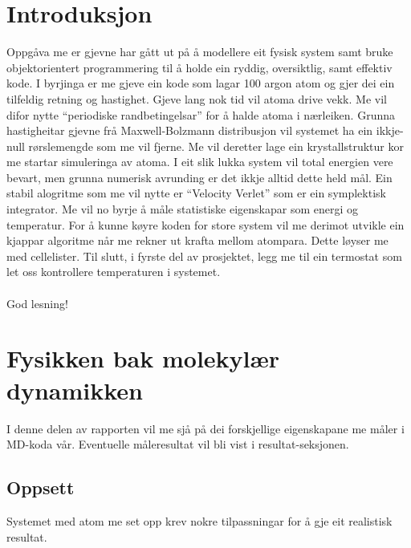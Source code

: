 \documentclass[12pt, a4paper]{article}
\theoremstyle{definition}
\begin{document}
\newpage
    \tableofcontents
\newpage

\section*{Introduksjon}
    Oppgåva me er gjevne har gått ut på å modellere eit fysisk system samt bruke objektorientert programmering til å holde ein ryddig, oversiktlig, samt effektiv kode. 
    I byrjinga er me gjeve ein kode som lagar 100 argon atom og gjer dei ein tilfeldig retning og hastighet. Gjeve lang nok tid vil atoma drive vekk. Me vil difor nytte
    ``periodiske randbetingelsar'' for å halde atoma i nærleiken. Grunna hastigheitar gjevne frå Maxwell-Bolzmann distribusjon vil systemet ha ein ikkje-null
    rørslemengde som me vil fjerne. Me vil deretter lage ein krystallstruktur kor me startar simuleringa av atoma. I eit slik lukka system vil total energien vere bevart, 
    men grunna numerisk avrunding er det ikkje alltid dette held mål. Ein stabil alogritme som me vil nytte er ``Velocity Verlet'' som er ein symplektisk integrator. %
    Me vil no byrje å måle statistiske eigenskapar som energi og temperatur. For å kunne køyre koden for store system vil me derimot utvikle ein kjappar algoritme når 
    me rekner ut krafta mellom atompara. Dette løyser me med cellelister. Til slutt, i fyrste del av prosjektet, legg me til ein termostat som let oss kontrollere 
    temperaturen i systemet. \\ \\
    God lesning!



\newpage


\section*{Fysikken bak molekylær dynamikken}
    I denne delen av rapporten vil me sjå på dei forskjellige eigenskapane me måler i MD-koda vår. Eventuelle måleresultat vil bli vist i resultat-seksjonen.

    \subsection*{Oppsett}
        Systemet med atom me set opp krev nokre tilpassningar for å gje eit realistisk resultat. 
\end{document}
